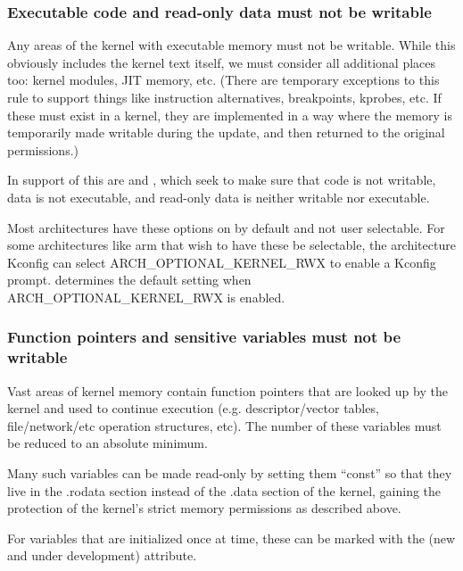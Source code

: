 \documentclass[a4paper,8pt,english]{sphinxmanual}
\begin{document}
\subsubsection{Executable code and read-only data must not be writable}
\label{security/self-protection:executable-code-and-read-only-data-must-not-be-writable}
Any areas of the kernel with executable memory must not be writable.
While this obviously includes the kernel text itself, we must consider
all additional places too: kernel modules, JIT memory, etc. (There are
temporary exceptions to this rule to support things like instruction
alternatives, breakpoints, kprobes, etc. If these must exist in a
kernel, they are implemented in a way where the memory is temporarily
made writable during the update, and then returned to the original
permissions.)

In support of this are  and
, which seek to make sure that code is not
writable, data is not executable, and read-only data is neither writable
nor executable.

Most architectures have these options on by default and not user selectable.
For some architectures like arm that wish to have these be selectable,
the architecture Kconfig can select ARCH\_OPTIONAL\_KERNEL\_RWX to enable
a Kconfig prompt.  determines
the default setting when ARCH\_OPTIONAL\_KERNEL\_RWX is enabled.


\subsubsection{Function pointers and sensitive variables must not be writable}
\label{security/self-protection:function-pointers-and-sensitive-variables-must-not-be-writable}
Vast areas of kernel memory contain function pointers that are looked
up by the kernel and used to continue execution (e.g. descriptor/vector
tables, file/network/etc operation structures, etc). The number of these
variables must be reduced to an absolute minimum.

Many such variables can be made read-only by setting them ``const''
so that they live in the .rodata section instead of the .data section
of the kernel, gaining the protection of the kernel's strict memory
permissions as described above.

For variables that are initialized once at  time, these can
be marked with the (new and under development) 
attribute.
\end{document}
